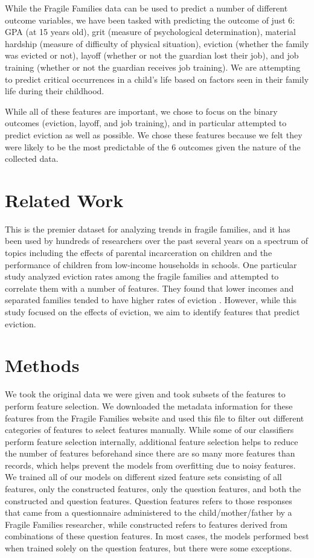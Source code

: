\documentclass{article} %
\begin{document}
While the Fragile Families data can be used to predict a number of different outcome variables, we have been tasked with predicting the outcome of just 6: GPA (at 15 years old), grit (measure of psychological determination), material hardship (measure of difficulty of physical situation), eviction (whether the family was evicted or not), layoff (whether or not the guardian lost their job), and job training (whether or not the guardian receives job training). We are attempting to predict critical occurrences in a child's life based on factors seen in their family life during their childhood.

While all of these features are important, we chose to focus on the binary outcomes (eviction, layoff, and job training), and in particular attempted to predict eviction as well as possible. We chose these features because we felt they were likely to be the most predictable of the 6 outcomes given the nature of the collected data.

\section{Related Work}

This is the premier dataset for analyzing trends in fragile families, and it has been used by hundreds of researchers over the past several years on a spectrum of topics including the effects of parental incarceration on children and the performance of children from low-income households in schools. One particular study analyzed eviction rates among the fragile families and attempted to correlate them with a number of features. They found that lower incomes and separated families tended to have higher rates of eviction \cite{evic}. However, while this study focused on the effects of eviction, we aim to identify features that predict eviction.

\section{Methods} \label{m}

We took the original data we were given and took subsets of the features to perform feature selection. We downloaded the metadata information for these features from the Fragile Families website and used this file to filter out different categories of features to select features manually. While some of our classifiers perform feature selection internally, additional feature selection helps to reduce the number of features beforehand since there are so many more features than records, which helps prevent the models from overfitting due to noisy features. We trained all of our models on different sized feature sets consisting of all features, only the constructed features, only the question features, and both the constructed and question features. Question features refers to those responses that came from a questionnaire administered to the child/mother/father by a Fragile Families researcher, while constructed refers to features derived from combinations of these question features. In most cases, the models performed best when trained solely on the question features, but there were some exceptions.
\end{document}
